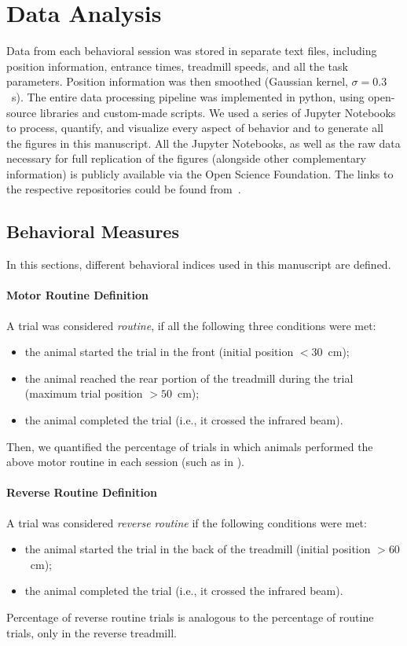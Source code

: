 \section{Data Analysis} 
\label{ch:methods:dataAnalysis}

Data from each behavioral session was stored in separate text files, including position information, entrance times, treadmill speeds, and all the task parameters.
Position information was then smoothed (Gaussian kernel, $\sigma = 0.3$~s).
The entire data processing pipeline was implemented in python, using open-source libraries and custom-made scripts.
We used a series of Jupyter Notebooks to process, quantify, and visualize every aspect of behavior and to generate all the figures in this manuscript.
All the Jupyter Notebooks, as well as the raw data necessary for full replication of the figures (alongside other complementary information) is publicly available via the Open Science Foundation.
The links to the respective repositories could be found from~\cite{Safaie2020PNAS,JuradoParras2020}.

\subsection{Behavioral Measures}
In this sections, different behavioral indices used in this manuscript are defined.


\paragraph{Motor Routine Definition}
A trial was considered \emph{routine}\!{}, if all the following three conditions were met:
\begin{itemize}[noitemsep]
    \item the animal started the trial in the front (initial position $< 30$~cm);
    \item the animal reached the rear portion of the treadmill during the trial (maximum trial position $>50$~cm);
    \item the animal completed the trial (i.e., it crossed the infrared beam).
\end{itemize}
Then, we quantified the percentage of trials in which animals performed the above motor routine in each session (such as in ).


\paragraph{Reverse Routine Definition}
A trial was considered \emph{reverse routine}\!{} if the following conditions were met:
\begin{itemize}[noitemsep]
    \item the animal started the trial in the back of the treadmill (initial position $> 60$~cm);
    \item the animal completed the trial (i.e., it crossed the infrared beam).
\end{itemize}
Percentage of reverse routine trials is analogous to the percentage of routine trials, only in the reverse treadmill.


